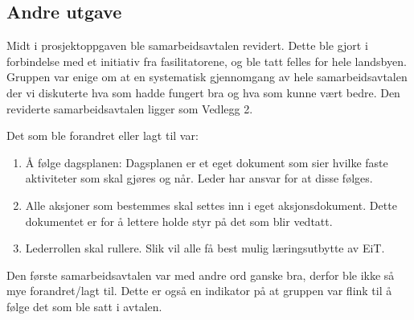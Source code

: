 \subsection*{Andre utgave}
Midt i prosjektoppgaven ble samarbeidsavtalen revidert. 
Dette ble gjort i forbindelse med et initiativ fra fasilitatorene, og ble tatt felles for hele landsbyen. 
Gruppen var enige om at en systematisk gjennomgang av hele samarbeidsavtalen der vi diskuterte hva som hadde fungert bra og hva som kunne vært bedre. 
Den reviderte samarbeidsavtalen ligger som Vedlegg 2. 
\vspace{\secspace}

\noindent Det som ble forandret eller lagt til var: 
\begin{enumerate}
  \item Å følge dagsplanen: Dagsplanen er et eget dokument som sier hvilke faste aktiviteter som skal gjøres og når. Leder har ansvar for at disse følges. 
  \item Alle aksjoner som bestemmes skal settes inn i eget aksjonsdokument. Dette dokumentet er for å lettere holde styr på det som blir vedtatt.
  \item Lederrollen skal rullere. Slik vil alle få best mulig læringsutbytte av EiT. 
\end{enumerate}

Den første samarbeidsavtalen var med andre ord ganske bra, derfor ble ikke så mye forandret/lagt til. 
Dette er også en indikator på at gruppen var flink til å følge det som ble satt i avtalen. 
